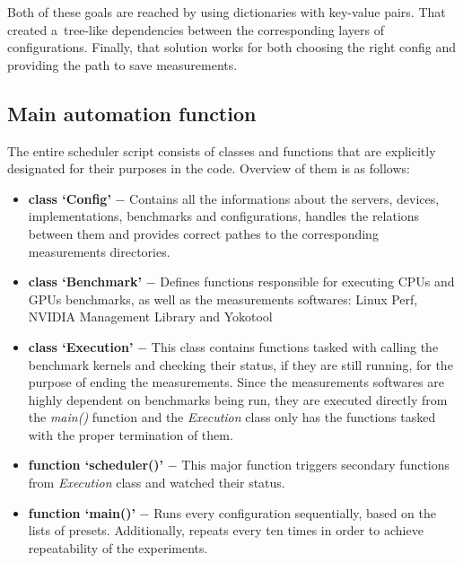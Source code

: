 Both of these goals are reached by using dictionaries with key-value pairs.
That created a~tree-like dependencies between the corresponding layers of
configurations. Finally, that solution works for both choosing the right
config and providing the path to save measurements.

\newpage

\subsection{Main automation function}


The entire scheduler script consists of classes and functions that are
explicitly designated for their purposes in the code. Overview of them is
as follows:

\begin{itemize}
    \item \textbf{class `Config'} $-$ Contains all the informations about the servers,
    devices, implementations, benchmarks and configurations, handles the
    relations between them and provides correct pathes to the corresponding
    measurements directories.
    \item \textbf{class `Benchmark'} $-$ Defines functions responsible for
    executing CPUs and GPUs benchmarks, as well as the measurements
    softwares: Linux Perf, NVIDIA Management Library and Yokotool
    \item \textbf{class `Execution'} $-$ This class contains functions tasked with
    calling the benchmark kernels and checking their status, if they are still
    running, for the purpose of ending the measurements. Since the
    measurements softwares are highly dependent on benchmarks being run, they
    are executed directly from the \emph{main\@()} function and
    the \emph{Execution} class only has the functions tasked with the proper
    termination of them.
    \item \textbf{function `scheduler\@()'} $-$ This major function triggers
    secondary functions from \emph{Execution} class and watched their status.
    \item \textbf{function `main\@()'} $-$ Runs every configuration
    sequentially, based on the lists of presets. Additionally, repeats every
    ten times in order to achieve repeatability of the experiments.
\end{itemize}

